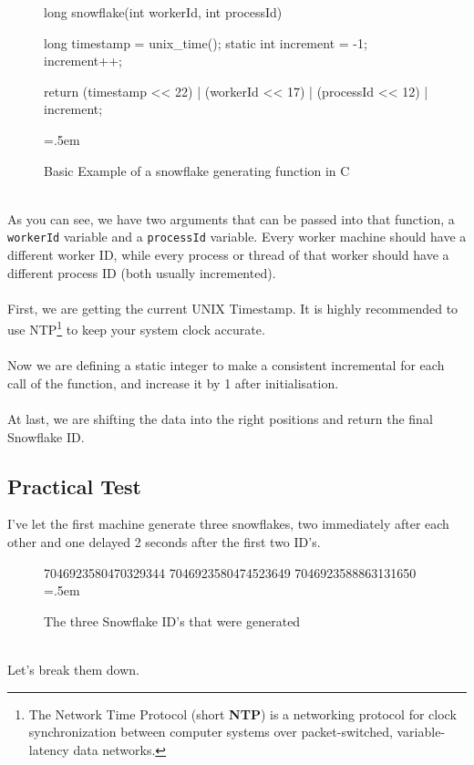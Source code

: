 \documentclass{article}
\newcommand{\code}[1]{\colorbox{cverbbg}{\texttt{#1}}}
\newcommand{\hn}[0]{\hfill \\}
\newenvironment{lcverbatim}
{\SaveVerbatim{cverb}}
{\endSaveVerbatim{}
    \flushleft\fboxrule=0pt\fboxsep=.5em
    \colorbox{cverbbg}{%

        \makebox[\dimexpr\linewidth-2\fboxsep][l]{\BUseVerbatim{cverb}}%
    }
    \endflushleft{}
}
\begin{document}
\begin{figure}[H]
    \begin{lcverbatim}
        long snowflake(int workerId, int processId) {
                long timestamp = unix_time();
                static int increment = -1;
                increment++;

                return (timestamp << 22)
                | (workerId << 17)
                | (processId << 12)
                | increment;
            }
    \end{lcverbatim}
    \caption{Basic Example of a snowflake generating function in
        C}\label{fig:ex_gen_function}
\end{figure}
\hn{}
As you can see, we have two arguments that can be passed into that function, a
\code{workerId} variable and a \code{processId} variable. Every worker machine
should have a different worker ID, while every process or thread of that worker
should have a different process ID (both usually incremented).\\
\hn{}
First, we are getting the current UNIX Timestamp. It is highly recommended to
use NTP\footnote{The Network Time Protocol (short \textbf{NTP}) is a networking
    protocol for clock synchronization between computer systems over
    packet-switched, variable-latency data networks.} to keep your system clock
accurate. \\
\hn{}
Now we are defining a static integer to make a consistent incremental for each
call of the function, and increase it by 1 after initialisation. \\
\hn{}
At last, we are shifting the data into the right positions and return the final
Snowflake ID.\@

\pagebreak

\subsection{Practical Test}
I've let the first machine generate three snowflakes, two immediately after
each other and one delayed 2 seconds after the first two ID's.

\begin{figure}[H]
    \begin{lcverbatim}
        7046923580470329344
        7046923580474523649
        7046923588863131650
    \end{lcverbatim}
    \caption{The three Snowflake ID's that were generated}\label{fig:output_1}
\end{figure}
\hn{}
Let's break them down. \\
\end{document}
